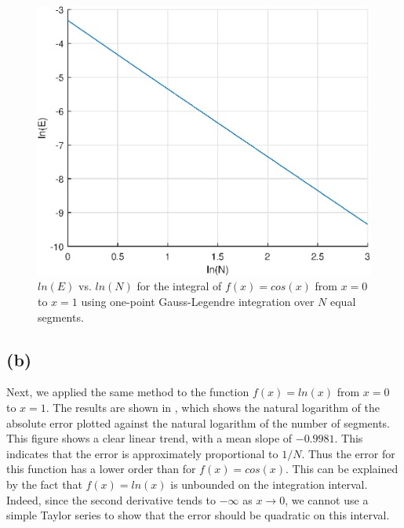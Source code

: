 \documentclass[journal,hidelinks]{IEEEtran}
\begin{document}
\begin{figure}[!htb]
  \centering
  \includegraphics[width=\columnwidth]{question-4/q4a.eps}
  \caption{$ln(E)$ vs. $ln(N)$ for the integral of $f(x) = cos(x)$ from $x = 0$ to $x = 1$ using one-point Gauss-Legendre integration over $N$ equal segments.}
  \label{fig:q4a}
\end{figure}

\subsection*{(b)}

Next, we applied the same method to the function $f(x) = ln(x)$ from $x = 0$ to $x = 1$. The results are shown in , which shows the natural logarithm of the absolute error plotted against the natural logarithm of the number of segments. This figure shows a clear linear trend, with a mean slope of $-0.9981$. This indicates that the error is approximately proportional to $1/N$. Thus the error for this function has a lower order than for $f(x) = cos(x)$. This can be explained by the fact that $f(x) = ln(x)$ is unbounded on the integration interval. Indeed, since the second derivative tends to $-\infty$ as $x \to 0$, we cannot use a simple Taylor series to show that the error should be quadratic on this interval.
\end{document}
